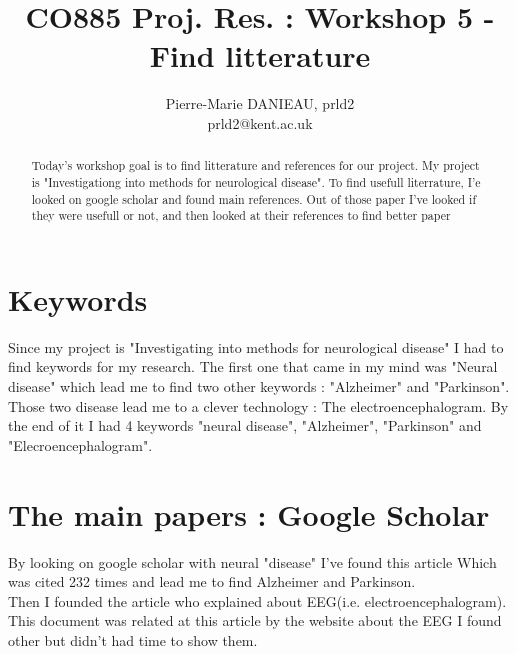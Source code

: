 \documentclass[11pt, a4paper]{article}
\author{Pierre-Marie DANIEAU, prld2\\prld2@kent.ac.uk}
\title{CO885 Proj. Res. : Workshop 5 - Find litterature}
\begin{document}
\maketitle

\begin{abstract}
Today's workshop goal is to find litterature and references for our project. My project is "Investigationg into methods for neurological disease".
To find usefull literrature, I'e looked on google scholar and found main references. Out of those paper I've looked if they were usefull or not, and then looked at their references to find better paper
\end{abstract}

\section{Keywords}

Since my project is "Investigating into methods for neurological disease" I had to find keywords for my research. The first one that came in my mind was "Neural disease" which lead me to find two other keywords : "Alzheimer" and "Parkinson". Those two disease lead me to a clever technology : The electroencephalogram.
By the end of it I had 4 keywords "neural disease", "Alzheimer", "Parkinson" and "Elecroencephalogram".

\section{The main papers : Google Scholar}

By looking on google scholar with neural "disease" I've found this article\cite{doi:10.1080/1071576031000083161} Which was cited 232 times and lead me to find Alzheimer and Parkinson.\\
Then I founded the article \cite{PRITCHARD1994118:1} who explained about EEG(i.e. electroencephalogram).
This document was related at this article by the website \cite{Debener11730:1} about the EEG
I found other but didn't had time to show them.



\end{document}
